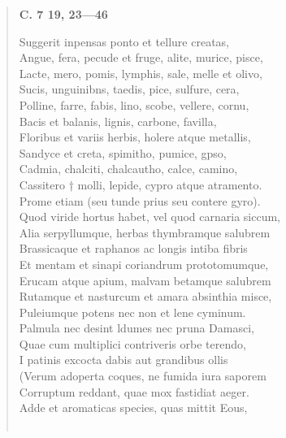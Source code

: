 \documentclass[11pt, a4paper]{report}
\begin{document}
\begin{verse}
    \begin{center} \textbf{C. 7 19, 23—46} \end{center} \marginpar{[198]} Suggerit inpensas ponto et tellure creatas, \\ Angue, fera, pecude et fruge, alite, murice, pisce, \\ Lacte, mero, pomis, lymphis, sale, melle et olivo, \\ Sucis, unguinibns, taedis, pice, sulfure, cera, \\ Polline, farre, fabis, lino, scobe, vellere, cornu, \\ Bacis et balanis, lignis, carbone, favilla, \\ Floribus et variis herbis, holere atque metallis, \\ Sandyce et creta, spimitho, pumice, gpso, \\ Cadmia, chalciti, chalcautho, calce, camino, \\ Cassitero † molli, lepide, cypro atque atramento. \\ Prome etiam (seu tunde prius seu contere gyro). \\ Quod viride hortus habet, vel quod carnaria siccum, \\ Alia serpyllumque, herbas thymbramque salubrem \\ Brassicaque et raphanos ac longis intiba fibris \\ Et mentam et sinapi coriandrum prototomumque, \\ Erucam atque apium, malvam betamque salubrem \\ Rutamque et nasturcum et amara absinthia misce, \\ Puleiumque potens nec non et lene cyminum. \\ Palmula nec desint ldumes nec pruna Damasci, \\ Quae cum multiplici contriveris orbe terendo, \\ I patinis excocta dabis aut grandibus ollis \\ (Verum adoperta coques, ne fumida iura saporem \\ Corruptum reddant, quae mox fastidiat aeger. \\ Adde et aromaticas species, quas mittit Eous, \\ 
        ﻿\pagebreak 

\end{verse}
\end{document}
